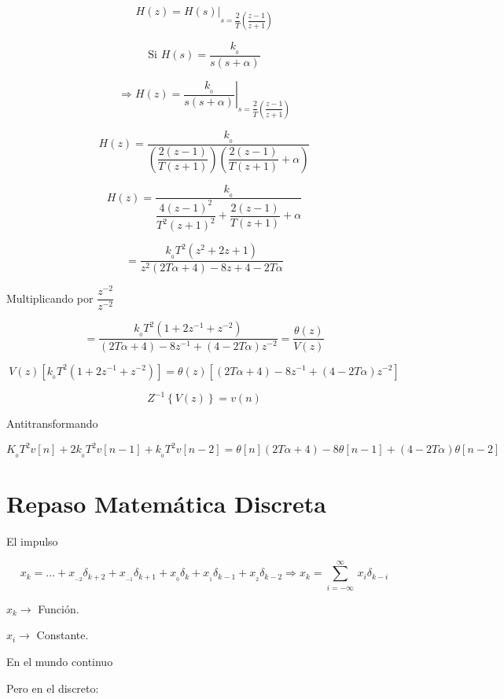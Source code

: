 $$H(z) = \left. H(s) \right|_{s = \dfrac{2}{T} \left( \dfrac{z - 1}{z + 1} \right)}$$

$$\mbox{Si } H(s) = \dfrac{k_{_0}}{s(s + \alpha)}$$

$$\Rightarrow H(z) = \left. \dfrac{k_{_0}}{s(s + \alpha)} \right|_{s = \dfrac{2}{T} \left( \dfrac{z - 1}{z + 1} \right)}$$

$$H(z) = \dfrac{k_{_0}}{\left( \dfrac{2(z - 1)}{T(z + 1)} \right) \left( \dfrac{2(z - 1)}{T(z + 1)}  + \alpha \right)}$$

$$H(z) = \dfrac{k_{_0}}{\dfrac{4(z - 1)^{2}}{T^{2}(z + 1)^{2}} + \dfrac{2(z - 1)}{T(z + 1)} + \alpha}$$

$$= \dfrac{k_{_0}T^{2}(z^{2} + 2z + 1)}{z^{2}(2T\alpha + 4) - 8z + 4 -2T\alpha}$$

Multiplicando por $\dfrac{z^{-2}}{z^{-2}}$

$$= \dfrac{k_{_0}T^{2}(1 + 2z^{-1} + z^{-2})}{(2T\alpha + 4) - 8z^{-1} + (4 - 2T\alpha)z^{-2}} = \dfrac{\theta (z)}{V(z)}$$

$$V(z)\left[ k_{_0}T^{2}(1 + 2z^{-1} + z^{-2}) \right] = \theta(z) \left[ (2T\alpha + 4) - 8z^{-1} + (4 - 2T\alpha)z^{-2} \right]$$

$$Z^{-1} \left\lbrace  V(z) \right\rbrace = v(n)$$

Antitransformando

$$K_{_0}T^{2}v[n] + 2k_{_0}T^{2}v[n - 1] + k_{_0}T^{2}v[n -2] = \theta[n] (2T\alpha + 4) - 8\theta[n - 1] + (4 - 2T\alpha)\theta[n - 2]$$



\section{Repaso Matemática Discreta}


El impulso



$$x_{k} = \ldots + x_{_{-2}}\delta_{k + 2} + x_{_{-1}}\delta_{k + 1} + x_{_0} \delta_{k} + x_{_1}\delta_{k - 1} + x_{_2}\delta_{k - 2} \Rightarrow x_{k} = \sum_{i = -\infty}^{\infty}\, x_{i}\delta_{k - i}$$

$x_{k} \rightarrow $ Función.

$x_{i} \rightarrow $ Constante.

En el mundo continuo


Pero en el discreto:


